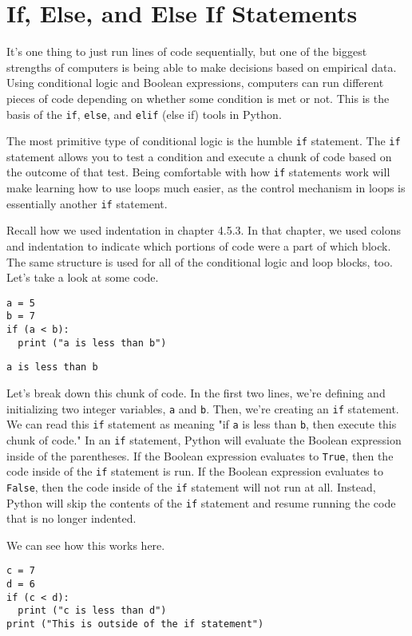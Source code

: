\section{If, Else, and Else If Statements}
It's one thing to just run lines of code sequentially, but one of the biggest strengths of computers is being able to make decisions based on empirical data. Using conditional logic and Boolean expressions, computers can run different pieces of code depending on whether some condition is met or not. This is the basis of the \verb|if|, \verb|else|, and \verb|elif| (else if) tools in Python.\par
The most primitive type of conditional logic is the humble \verb|if| statement. The \verb|if| statement allows you to test a condition and execute a chunk of code based on the outcome of that test. Being comfortable with how \verb|if| statements work will make learning how to use loops much easier, as the control mechanism in loops is essentially another \verb|if| statement.\par
Recall how we used indentation in chapter 4.5.3. In that chapter, we used colons and indentation to indicate which portions of code were a part of which block. The same structure is used for all of the conditional logic and loop blocks, too. Let's take a look at some code.\par
\begin{lstlisting}[style=pippython]
a = 5
b = 7
if (a < b):
  print ("a is less than b")
\end{lstlisting}
\begin{lstlisting}
a is less than b
\end{lstlisting}
Let's break down this chunk of code. In the first two lines, we're defining and initializing two integer variables, \verb|a| and \verb|b|. Then, we're creating an \verb|if| statement. We can read this \verb|if| statement as meaning "if \verb|a| is less than \verb|b|, then execute this chunk of code." In an \verb|if| statement, Python will evaluate the Boolean expression inside of the parentheses. If the Boolean expression evaluates to \verb|True|, then the code inside of the \verb|if| statement is run. If the Boolean expression evaluates to \verb|False|, then the code inside of the \verb|if| statement will not run at all. Instead, Python will skip the contents of the \verb|if| statement and resume running the code that is no longer indented.\par
We can see how this works here.\par
\begin{lstlisting}[style=pippython]
c = 7
d = 6
if (c < d):
  print ("c is less than d")
print ("This is outside of the if statement")
\end{lstlisting}
